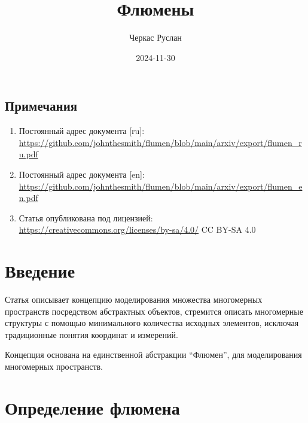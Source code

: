 \documentclass[final]{article}
\begin{document}
    \title{Флюмены}
    \author{Черкас Руслан}
    \date{2024-11-30}

    \begin{small}
        \begingroup
        \renewcommand{\baselinestretch}{0.8}

        \renewcommand{\contentsname}{Содержание}
        \maketitle
        \tableofcontents

        \section*{Примечания}
            \begin{enumerate}
                \item Постоянный адрес документа [ru]: 
                \url{https://github.com/johnthesmith/flumen/blob/main/arxiv/export/flumen_ru.pdf}

                \item Постоянный адрес документа [en]: 
                \url{https://github.com/johnthesmith/flumen/blob/main/arxiv/export/flumen_en.pdf}

                \item Статья опубликована под лицензией: 
                \url{https://creativecommons.org/licenses/by-sa/4.0/} CC BY-SA 4.0
            \end{enumerate}
        \endgroup
    \end{small}

    \section{Введение}

        Статья описывает концепцию моделирования множества многомерных 
        пространств посредством абстрактных объектов, стремится описать 
        многомерные структуры с помощью минимального количества исходных 
        элементов, исключая традиционные понятия координат и измерений.

        Концепция основана на единственной абстракции ``Флюмен'', для 
        моделирования многомерных пространств.

    \section{Определение флюмена} 
\end{document}
